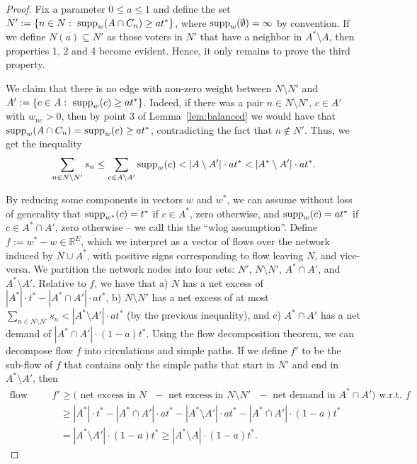 \begin{proof}
Fix a parameter $0\leq a\leq 1$ and define the set $N':=\{n\in N: \ \supp_w(A\cap C_n)\geq at^*\}$, where $\operatorname{supp}_w(\emptyset)=\infty$ by convention. If we define $N(a)\subseteq N'$ as those voters in $N'$ that have a neighbor in $A^*\setminus A$, then properties 1, 2 and 4 become evident. Hence, it only remains to prove the third property.

We claim that there is no edge with non-zero weight between $N\setminus N'$ and $A':=\{c\in A: \ \operatorname{supp}_w(c)\geq at^*\}$. 
Indeed, if there was a pair $n\in N\setminus N'$, $c\in A'$ with $w_{nc}>0$, then by point 3 of Lemma~\ref{lem:balanced} we would have that $\operatorname{supp}_w(A\cap C_n)=\operatorname{supp}_w(c)\geq at^*$, contradicting the fact that $n\not\in N'$. 
Thus, we get the inequality
$$\sum_{n\in N\setminus N'} s_n \leq \sum_{c\in A\setminus A'} \operatorname{supp}_w(c) < |A\setminus A'|\cdot at^*< |A^*\setminus A'|\cdot at^*.$$

By reducing some components in vectors $w$ and $w^*$, we can assume without loss of generality that $\operatorname{supp}_{w^*}(c)=t^*$ if $c\in A^*$, zero otherwise, and $\operatorname{supp}_{w}(c)=a t^*$ if $c\in A^*\cap A'$, zero otherwise -- we call this the ``wlog assumption''.
Define $f:=w^* - w\in\mathbb{R}^E$, which we interpret as a vector of flows over the network induced by $N\cup A^*$, with positive signs corresponding to flow leaving $N$, and vice-versa. We partition the network nodes into four sets: $N'$, $N\setminus N'$, $A^*\cap A'$, and $A^*\setminus A'$. Relative to $f$, we have that a) $N$ has a net excess of $|A^*|\cdot t^* - |A^*\cap A'|\cdot a t^*$, b) $N\setminus N'$ has a net excess of at most $\sum_{n\in N\setminus N'} s_n < |A^*\setminus A'|\cdot at^*$ (by the previous inequality), and c) $A^*\cap A'$ has a net demand of $|A^*\cap A'|\cdot (1-a) t^*$. 
Using the flow decomposition theorem, we can decompose flow $f$ into circulations and simple paths. If we define $f'$ to be the sub-flow of $f$ that contains only the simple paths that start in $N'$ and end in $A^*\setminus A'$, then %
%
\begin{align*}
    \text{flow value in } f' &\geq (\text{ net excess in $N$ } - \text{ net excess in $N\setminus N'$ } - \text{ net demand in $A^*\cap A')$ w.r.t. } f\\
    &\geq |A^*|\cdot t^* - |A^*\cap A'|\cdot a t^* -|A^*\setminus A'|\cdot a t^* -|A^*\cap A'|\cdot (1-a) t^*\\
    & = |A^*\setminus A'|\cdot (1-a)t^* \geq |A^* \setminus A|\cdot (1-a)t^*.
\end{align*}


\end{proof}
